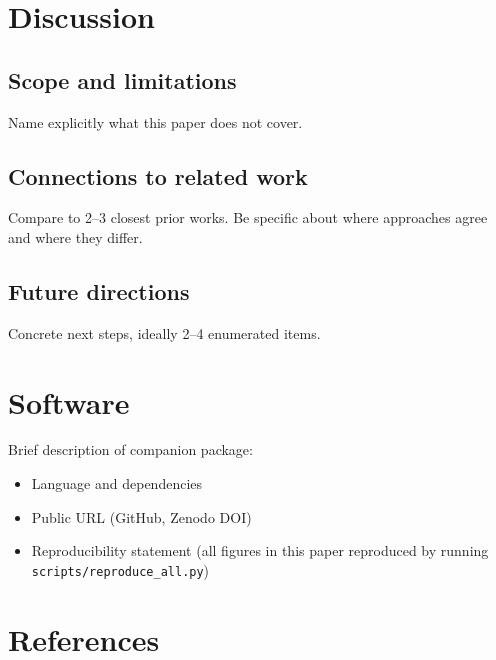 \documentclass[11pt,a4paper]{article}
\theoremstyle{plain}
\theoremstyle{definition}
\begin{document}

\section{Discussion}
\label{sec:discussion}

\subsection{Scope and limitations}

Name explicitly what this paper does not cover.

\subsection{Connections to related work}

Compare to 2--3 closest prior works. Be specific about where
approaches agree and where they differ.

\subsection{Future directions}

Concrete next steps, ideally 2--4 enumerated items.


\section{Software}
\label{sec:software}

Brief description of companion package:
\begin{itemize}
\item Language and dependencies
\item Public URL (GitHub, Zenodo DOI)
\item Reproducibility statement (all figures in this paper reproduced
  by running \texttt{scripts/reproduce\_all.py})
\end{itemize}


\section*{References}
\end{document}
